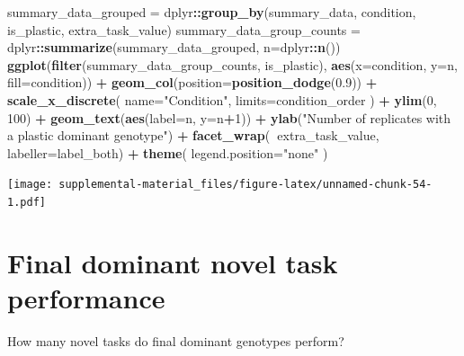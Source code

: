 \documentclass[]{book}
\newenvironment{Shaded}{\begin{snugshade}}{\end{snugshade}}
\newcommand{\DataTypeTok}[1]{\textcolor[rgb]{0.13,0.29,0.53}{#1}}
\newcommand{\DecValTok}[1]{\textcolor[rgb]{0.00,0.00,0.81}{#1}}
\newcommand{\FloatTok}[1]{\textcolor[rgb]{0.00,0.00,0.81}{#1}}
\newcommand{\KeywordTok}[1]{\textcolor[rgb]{0.13,0.29,0.53}{\textbf{#1}}}
\newcommand{\NormalTok}[1]{#1}
\newcommand{\OperatorTok}[1]{\textcolor[rgb]{0.81,0.36,0.00}{\textbf{#1}}}
\newcommand{\StringTok}[1]{\textcolor[rgb]{0.31,0.60,0.02}{#1}}
\begin{document}
\begin{Shaded}
\begin{Highlighting}[]
\NormalTok{summary_data_grouped =}\StringTok{ }\NormalTok{dplyr}\OperatorTok{::}\KeywordTok{group_by}\NormalTok{(summary_data, condition, is_plastic, extra_task_value)}
\NormalTok{summary_data_group_counts =}\StringTok{ }\NormalTok{dplyr}\OperatorTok{::}\KeywordTok{summarize}\NormalTok{(summary_data_grouped, }\DataTypeTok{n=}\NormalTok{dplyr}\OperatorTok{::}\KeywordTok{n}\NormalTok{())}
\KeywordTok{ggplot}\NormalTok{(}\KeywordTok{filter}\NormalTok{(summary_data_group_counts, is_plastic), }\KeywordTok{aes}\NormalTok{(}\DataTypeTok{x=}\NormalTok{condition, }\DataTypeTok{y=}\NormalTok{n, }\DataTypeTok{fill=}\NormalTok{condition)) }\OperatorTok{+}
\StringTok{  }\KeywordTok{geom_col}\NormalTok{(}\DataTypeTok{position=}\KeywordTok{position_dodge}\NormalTok{(}\FloatTok{0.9}\NormalTok{)) }\OperatorTok{+}
\StringTok{  }\KeywordTok{scale_x_discrete}\NormalTok{(}
    \DataTypeTok{name=}\StringTok{"Condition"}\NormalTok{,}
    \DataTypeTok{limits=}\NormalTok{condition_order}
\NormalTok{  ) }\OperatorTok{+}
\StringTok{  }\KeywordTok{ylim}\NormalTok{(}\DecValTok{0}\NormalTok{, }\DecValTok{100}\NormalTok{) }\OperatorTok{+}
\StringTok{  }\KeywordTok{geom_text}\NormalTok{(}\KeywordTok{aes}\NormalTok{(}\DataTypeTok{label=}\NormalTok{n, }\DataTypeTok{y=}\NormalTok{n}\OperatorTok{+}\DecValTok{1}\NormalTok{)) }\OperatorTok{+}
\StringTok{  }\KeywordTok{ylab}\NormalTok{(}\StringTok{"Number of replicates with a plastic dominant genotype"}\NormalTok{) }\OperatorTok{+}
\StringTok{  }\KeywordTok{facet_wrap}\NormalTok{(}\OperatorTok{~}\NormalTok{extra_task_value, }\DataTypeTok{labeller=}\NormalTok{label_both) }\OperatorTok{+}
\StringTok{  }\KeywordTok{theme}\NormalTok{(}
    \DataTypeTok{legend.position=}\StringTok{"none"}
\NormalTok{  )}
\end{Highlighting}
\end{Shaded}

\texttt{[image: supplemental-material\_files/figure-latex/unnamed-chunk-54-1.pdf]}

\hypertarget{final-dominant-novel-task-performance}{%
\section{Final dominant novel task performance}\label{final-dominant-novel-task-performance}}

How many novel tasks do final dominant genotypes perform?
\end{document}

